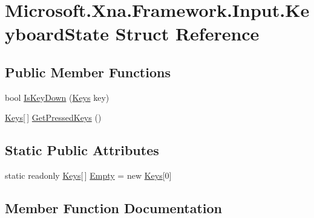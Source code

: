 \hypertarget{struct_microsoft_1_1_xna_1_1_framework_1_1_input_1_1_keyboard_state}{}\section{Microsoft.\+Xna.\+Framework.\+Input.\+Keyboard\+State Struct Reference}
\label{struct_microsoft_1_1_xna_1_1_framework_1_1_input_1_1_keyboard_state}
\subsection*{Public Member Functions}
\begin{DoxyCompactItemize}
\item 
bool \hyperlink{struct_microsoft_1_1_xna_1_1_framework_1_1_input_1_1_keyboard_state_a51e239901bb9eaacc9310d3e859c9537}{Is\+Key\+Down} (\hyperlink{namespace_microsoft_1_1_xna_1_1_framework_1_1_input_a9e25e9680456f428a10e71481db580fd}{Keys} key)
\item 
\hyperlink{namespace_microsoft_1_1_xna_1_1_framework_1_1_input_a9e25e9680456f428a10e71481db580fd}{Keys}\mbox{[}$\,$\mbox{]} \hyperlink{struct_microsoft_1_1_xna_1_1_framework_1_1_input_1_1_keyboard_state_a45aacd45588eb8caf4c95acd5348d1a5}{Get\+Pressed\+Keys} ()
\end{DoxyCompactItemize}
\subsection*{Static Public Attributes}
\begin{DoxyCompactItemize}
\item 
static readonly \hyperlink{namespace_microsoft_1_1_xna_1_1_framework_1_1_input_a9e25e9680456f428a10e71481db580fd}{Keys}\mbox{[}$\,$\mbox{]} \hyperlink{struct_microsoft_1_1_xna_1_1_framework_1_1_input_1_1_keyboard_state_ac88914b578fa414b2cbbdb663b670dbc}{Empty} = new \hyperlink{namespace_microsoft_1_1_xna_1_1_framework_1_1_input_a9e25e9680456f428a10e71481db580fd}{Keys}\mbox{[}0\mbox{]}
\end{DoxyCompactItemize}


\subsection{Member Function Documentation}
\hypertarget{struct_microsoft_1_1_xna_1_1_framework_1_1_input_1_1_keyboard_state_a45aacd45588eb8caf4c95acd5348d1a5}{}
